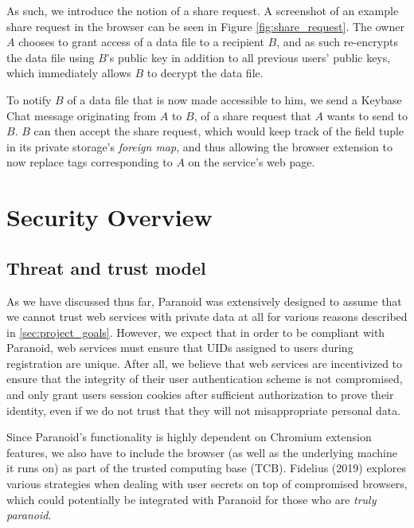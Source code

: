 \documentclass[letterpaper,twocolumn,10pt]{article}
\begin{document}
As such, we introduce the notion of a share request. A screenshot of an example share request in the browser can be seen in Figure \ref{fig:share_request}. The owner $A$ chooses to grant access of a data file to a recipient $B$, and as such re-encrypts the data file using $B$'s public key in addition to all previous users' public keys, which immediately allows $B$ to decrypt the data file.

To notify $B$ of a data file that is now made accessible to him, we send a Keybase Chat message originating from $A$ to $B$, of a share request that $A$ wants to send to $B$. $B$ can then accept the share request, which would keep track of the field tuple in its private storage's \textit{foreign map}, and thus allowing the browser extension to now replace tags corresponding to $A$ on the service's web page.

\section{Security Overview}

\subsection{Threat and trust model}

As we have discussed thus far, Paranoid was extensively designed to assume that we cannot trust web services with private data at all for various reasons described in \cref{sec:project_goals}. However, we expect that in order to be compliant with Paranoid, web services must ensure that UIDs assigned to users during registration are unique. After all, we believe that web services are incentivized to ensure that the integrity of their user authentication scheme is not compromised, and only grant users session cookies after sufficient authorization to prove their identity, even if we do not trust that they will not misappropriate personal data.

Since Paranoid's functionality is highly dependent on Chromium extension features, we also have to include the browser (as well as the underlying machine it runs on) as part of the trusted computing base (TCB). Fidelius (2019) \cite{Eskandarian2019} explores various strategies when dealing with user secrets on top of compromised browsers, which could potentially be integrated with Paranoid for those who are \textit{truly paranoid}.
\end{document}
